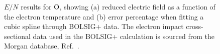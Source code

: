 \begin{figure}[!htbp]
\caption{$E/N$ results for $\rm O$, showing (a) reduced electric field as a function of the electron temperature and (b) error percentage when fitting a cubic spline through BOLSIG+ data. The electron impact cross-sectional data used in the BOLSIG+ calculation is sourced from the Morgan database, Ref.\ \cite{lxc:2024:morgan}.}
\label{fig:electronimpact_5}
\end{figure}
%

